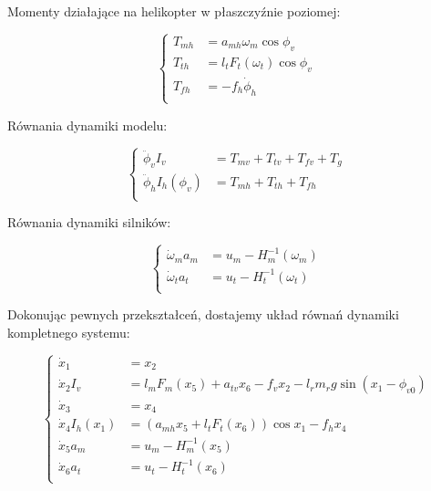 Momenty działające na helikopter w płaszczyźnie poziomej:

\begin{equation}
  \begin{cases}
    T_{mh} & = a_{mh}\omega_m\cos\phi_v \\
    T_{th} & = l_tF_t(\omega_t)\cos\phi_v \\
    T_{fh} & = -f_h\dot{\phi}_h \\
  \end{cases}
\end{equation}

Równania dynamiki modelu:

\begin{equation}
  \begin{cases}
    \ddot{\phi}_vI_v         & = T_{mv} + T_{tv} + T_{fv} + T_g \\
    \ddot{\phi}_hI_h(\phi_v) & = T_{mh} + T_{th} + T_{fh} \\
  \end{cases}
\end{equation}

Równania dynamiki silników:

\begin{equation}
  \begin{cases}
    \dot{\omega}_ma_m & = u_m - H_m^{-1}(\omega_m) \\
    \dot{\omega}_ta_t & = u_t - H_t^{-1}(\omega_t) \\
  \end{cases}
\end{equation}

Dokonując pewnych przekształceń, dostajemy układ równań dynamiki kompletnego
systemu:

\begin{equation}
  \begin{cases}
    \dot{x}_1 & = x_2 \\
    \dot{x}_2I_v & = l_mF_m(x_5) + a_{tv}x_6 -
    f_vx_2 - l_rm_rg\sin(x_1-\phi_{v0}) \\
    \dot{x}_3 & = x_4 \\
    \dot{x}_4I_h(x_1) & = (a_{mh}x_5 +
    l_tF_t(x_6))\cos x_1 - f_hx_4 \\
    \dot{x}_5a_m & = u_m - H_m^{-1}(x_5) \\
    \dot{x}_6a_t & = u_t - H_t^{-1}(x_6) \\
  \end{cases}
\end{equation}

